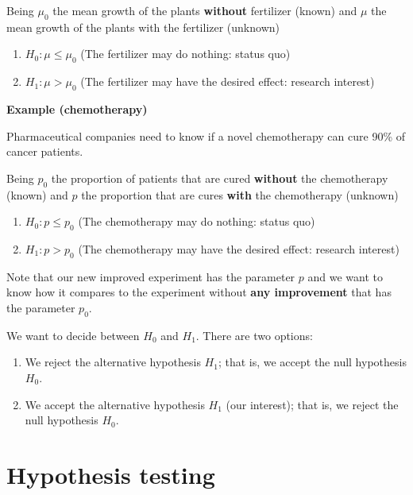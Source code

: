 \documentclass[
]{book}
\providecommand{\tightlist}{%
  \setlength{\itemsep}{0pt}\setlength{\parskip}{0pt}}
\begin{document}
Being \(\mu_0\) the mean growth of the plants \textbf{without} fertilizer (known) and \(\mu\) the mean growth of the plants with the fertilizer (unknown)

\begin{enumerate}
\def\labelenumi{\alph{enumi}.}
\tightlist
\item
  \(H_0:\mu \leq \mu_0\) (The fertilizer may do nothing: status quo)
\item
  \(H_1:\mu > \mu_0\) (The fertilizer may have the desired effect: research interest)
\end{enumerate}

\textbf{Example (chemotherapy)}

Pharmaceutical companies need to know if a novel chemotherapy can cure 90\% of cancer patients.

Being \(p_0\) the proportion of patients that are cured \textbf{without} the chemotherapy (known) and \(p\) the proportion that are cures \textbf{with} the chemotherapy (unknown)

\begin{enumerate}
\def\labelenumi{\alph{enumi}.}
\tightlist
\item
  \(H_0:p \leq p_0\) (The chemotherapy may do nothing: status quo)
\item
  \(H_1: p > p_0\) (The chemotherapy may have the desired effect: research interest)
\end{enumerate}

Note that our new improved experiment has the parameter \(p\) and we want to know how it compares to the experiment without \textbf{any improvement} that has the parameter \(p_0\).

We want to decide between \(H_0\) and \(H_1\). There are two options:

\begin{enumerate}
\def\labelenumi{\arabic{enumi}.}
\item
  We reject the alternative hypothesis \(H_1\); that is, we accept the null hypothesis \(H_0\).
\item
  We accept the alternative hypothesis \(H_1\) (our interest); that is, we reject the null hypothesis \(H_0\).
\end{enumerate}

\hypertarget{hypothesis-testing-1}{%
\section{Hypothesis testing}\label{hypothesis-testing-1}}
\end{document}
